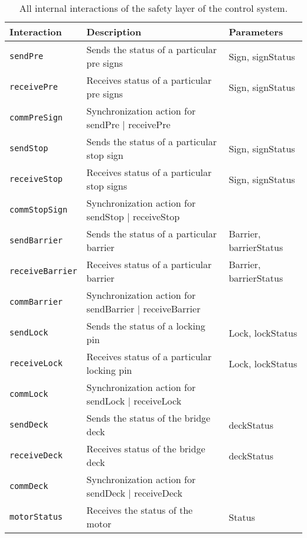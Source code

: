 \begin{table}[htb]%
\begin{tabular}{lll}
      \textbf{Interaction} &	\textbf{Description}	&	\textbf{Parameters}\\
      \hline
      \texttt{sendPre} & Sends the status of a particular pre signs & Sign, signStatus\\
      \texttt{receivePre} & Receives status of a particular pre signs & Sign, signStatus\\
      \texttt{commPreSign} & Synchronization action for sendPre $\mid$ receivePre &\\
      
      \texttt{sendStop} & Sends the status of a particular stop sign & Sign, signStatus\\
      \texttt{receiveStop} & Receives status of a particular stop signs & Sign, signStatus\\
      \texttt{commStopSign} & Synchronization action for sendStop $\mid$ receiveStop &\\
      
      \texttt{sendBarrier} & Sends the status of a particular barrier & Barrier, barrierStatus\\
      \texttt{receiveBarrier} & Receives status of a particular barrier & Barrier, barrierStatus\\
      \texttt{commBarrier} & Synchronization action for sendBarrier $\mid$ receiveBarrier &\\
      
      \texttt{sendLock} & Sends the status of a locking pin & Lock, lockStatus\\
      \texttt{receiveLock} & Receives status of a particular locking pin & Lock, lockStatus\\
      \texttt{commLock} & Synchronization action for sendLock $\mid$ receiveLock &\\
      
      \texttt{sendDeck} & Sends the status of the bridge deck & deckStatus\\
      \texttt{receiveDeck} & Receives status of the bridge deck & deckStatus\\
      \texttt{commDeck} & Synchronization action for sendDeck $\mid$ receiveDeck &\\
      
      \texttt{motorStatus} & Receives the status of the motor & Status\\
\end{tabular}
\caption{All internal interactions of the safety layer of the control system.}
\label{tab:int_act}
\end{table}

